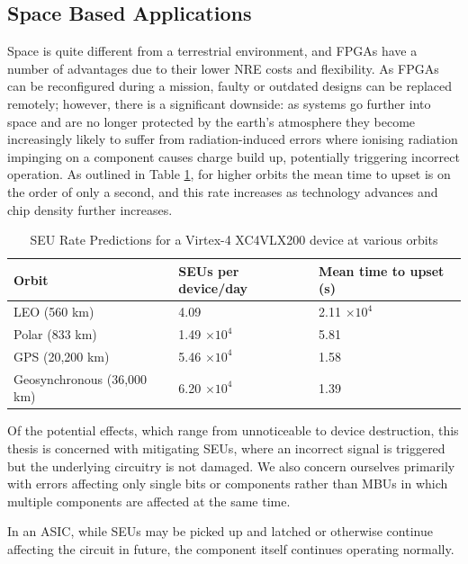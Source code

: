 \documentclass[12pt,final,oneside]{dwThesis} %
\begin{document}
   \subsection{Space Based Applications}
   Space is quite different from a terrestrial environment, and \glspl{FPGA} have a number of advantages due to their lower \gls{NRE} costs and flexibility. As \glspl{FPGA} can be reconfigured during a mission, faulty or outdated designs can be replaced remotely; however, there is a significant downside: as systems go further into space and are no longer protected by the earth's atmosphere they become increasingly likely to suffer from radiation-induced errors where ionising radiation impinging on a component causes charge build up, potentially triggering incorrect operation\cite{SEEMechanism}. As outlined in Table \ref{SEURate}, for higher orbits the mean time to upset is on the order of only a second, and this rate increases as technology advances and chip density further increases.
   \begin{table}
      \begin{center}
         \begin{tabular}{lll}
            \toprule
            Orbit & SEUs per device/day &Mean time to upset (s)\\
            \midrule
            LEO (560 km) & 4.09 & 2.11 $\times 10^4$\\
            Polar (833 km) & 1.49 $\times 10^4$ & 5.81\\
            GPS (20,200 km) & 5.46 $\times 10^4$ & 1.58\\
            Geosynchronous (36,000 km) & 6.20 $\times 10^4$ & 1.39\\
            \bottomrule
         \end{tabular}
         \caption{SEU Rate Predictions for a Virtex-4 XC4VLX200 device at various orbits\cite{DiesselChange}}
         \label{SEURate}
      \end{center}
   \end{table}
   Of the potential effects, which range from unnoticeable to device destruction, this thesis is concerned with mitigating \glspl{SEU}, where an incorrect signal is triggered but the underlying circuitry is not damaged. We also concern ourselves primarily with errors affecting only single bits or components rather than \glspl{MBU} in which multiple components are affected at the same time.

   In an \gls{ASIC}, while \glspl{SEU} may be picked up and latched or otherwise continue affecting the circuit in future, the component itself continues operating normally.
\end{document}
